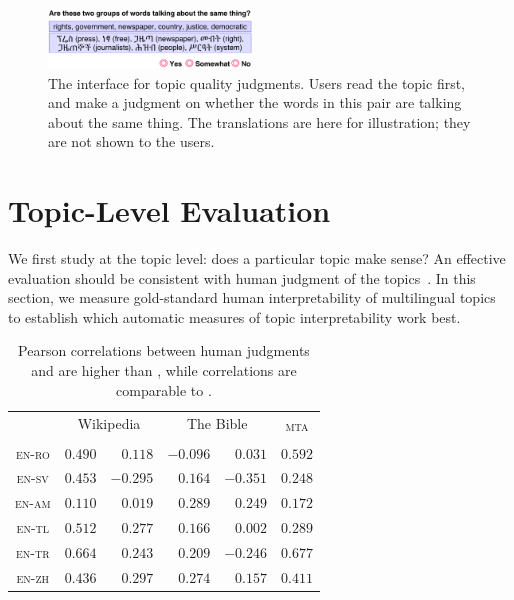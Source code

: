 
\begin{figure}[t!]
	\centering
	\includegraphics[width=0.48\textwidth]{2018_naacl_mltm_eval/figures/interface.pdf}
	\caption{The interface for topic quality judgments. Users read
		the topic first, and make a judgment on whether the words in
		this pair are talking about the same thing. The translations
		are here for illustration; they are not shown to the users.}
	\label{human-inter}
\end{figure}


\section{Topic-Level Evaluation}
\label{sec:topic-level}


We first study \cnpmi{} at the topic level: does a particular topic make
sense?  An effective evaluation should be consistent with
human judgment of the topics~\cite{ChangBGWB09}. In this section, we measure gold-standard
human interpretability of multilingual topics to
establish which automatic measures of topic interpretability work best.


\begin{table}[t!] \centering
	\small
	\setlength\tabcolsep{5pt}
	\begin{tabular}{c|rr|rr|c}
		\hline
		& \multicolumn{2}{c|}{Wikipedia} & \multicolumn{2}{c|}{The Bible} & \multirow{2}{*}{\textsc{mta}} \\ \cline{2-5}
		& \cnpmi{} & \inpmi{} &  \cnpmi{} & \inpmi{} & \\ \hline\hline
		\textsc{en-ro} & $0.490$ & $0.118$ & $-0.096$ & $0.031$ & $\bm{0.592}$ \\
		\textsc{en-sv} & $\bm{0.453}$ & $-0.295$ & $0.164$ & $-0.351$ & $0.248$ \\
		\textsc{en-am} & $0.110$ & $0.019$ & $\bm{0.289}$ & $0.249$ & $0.172$ \\
		\textsc{en-tl} & $\bm{0.512}$ & $0.277$ & $0.166$ & $0.002$ & $0.289$ \\
		\textsc{en-tr} & $0.664$ & $0.243$ & $0.209$ & $-0.246$ & $\bm{0.677}$ \\
		\textsc{en-zh} & $\bm{0.436}$ & $0.297$ & $0.274$ & $0.157$ & $0.411$ \\ \hline
	\end{tabular}
	\caption{Pearson correlations between human judgments and \cnpmi{} are higher than \inpmi{}, while \mta{} correlations are comparable to \cnpmi{}.}
	\label{tab:hj-table}
\end{table}



